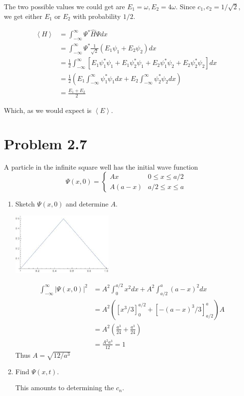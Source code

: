 \documentclass{article}
\newcommand{\bracket}[1]{\left[ #1 \right]}
\newcommand{\paren}[1]{\left( #1 \right)}
\newcommand{\braket}[1]{\left\langle #1 \right\rangle}
\newcommand{\intinf}{\int_{-\infty}^\infty}
\newenvironment{problem}{\begin{enumerate}[label=(\alph*)]}{\end{enumerate}}
\begin{document}
\begin{problem}
    The two possible values we could get are $E_1 = \omega, E_2 = 4 \omega$. 
    Since $c_1, c_2 = 1/\sqrt{2}$, we get either $E_1$ or $E_2$ with probability $1/2$.

    \begin{align*}
      \braket{H} &= \intinf \Psi^* \hat{H} \Psi dx \\
                 &= \intinf \Psi^* \frac{1}{\sqrt{2}}\paren{E_1 \psi_1 + E_2 \psi_2} dx \\
                 &= \frac{1}{2} \intinf \bracket{E_1 \psi_1^* \psi_1 + E_1 \psi_2^* \psi_1 + E_2 \psi_1^* \psi_2 + E_2 \psi_2^* \psi_2}dx \\
                 &= \frac{1}{2} \paren{E_1\intinf \psi_1^* \psi_1 dx + E_2 \intinf \psi_2^* \psi_2 dx} \\
                 &= \frac{E_1 + E_2}{2}
    \end{align*}

    Which, as we would expect is $\braket{E}$.

\end{problem}

\section*{Problem 2.7}
A particle in the infinite square well has the initial wave function 
$$\Psi(x, 0) = \begin{cases}
  Ax & 0 \leq x \leq a/2 \\
  A(a-x) & a/2 \leq x \leq a 
\end{cases}$$

\begin{problem}
\item Sketch $\Psi(x, 0)$ and determine $A$.

  \centerline{\includegraphics[width=2in]{2-7a.jpg}}

  \begin{align*}
    \intinf |\Psi(x, 0)|^2 &= A^2\int_0^{a/2} x^2 dx + A^2 \int_{a/2}^a (a-x)^2 dx \\ 
                           &= A^2 \paren{\bracket{x^3/3}_0^{a/2} + \bracket{-(a-x)^3/3}_{a/2}^a}A \\
                           &= A^2 \paren{\frac{a^3}{24} + \frac{a^3}{24}} \\
                           &= \frac{A^2 a^3}{12} = 1
  \end{align*}
  Thus $A = \sqrt{12/a^3}$

\item Find $\Psi(x, t)$.

  This amounts to determining the $c_n$.

\end{problem}
\end{document}
